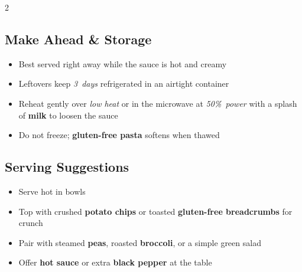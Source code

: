 \documentclass[11pt,letterpaper]{article}
\begin{document}
{\begin{multicols}{2}
\subsection*{Make Ahead \& Storage}
\begin{itemize}
    \item Best served right away while the sauce is hot and creamy
    \item Leftovers keep \textit{3~days} refrigerated in an airtight container
    \item Reheat gently over \textit{low heat} or in the microwave at \textit{50\%~power} with a splash of \textbf{milk} to loosen the sauce
    \item Do not freeze; \textbf{gluten-free pasta} softens when thawed
\end{itemize}

\subsection*{Serving Suggestions}
\begin{itemize}
    \item Serve hot in bowls
    \item Top with crushed \textbf{potato chips} or toasted \textbf{gluten-free breadcrumbs} for crunch
    \item Pair with steamed \textbf{peas}, roasted \textbf{broccoli}, or a simple green salad
    \item Offer \textbf{hot sauce} or extra \textbf{black pepper} at the table
\end{itemize}

\end{multicols}
}
\end{document}
